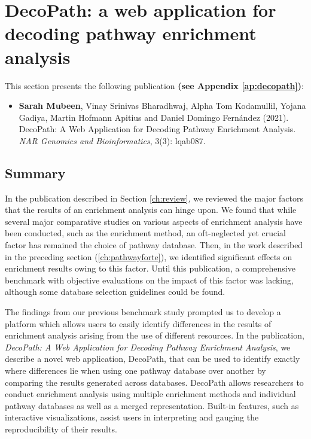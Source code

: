 \newpage

\section{DecoPath: a web application for decoding pathway enrichment analysis}

\label{ch:decopath}

This section presents the following publication \textbf{(see Appendix \ref{ap:decopath})}:

\begin{itemize}

\item[] \textbf{Sarah Mubeen}, Vinay Srinivas Bharadhwaj, Alpha Tom Kodamullil, Yojana Gadiya, Martin Hofmann Apitius and Daniel Domingo Fernández (2021). DecoPath: A Web Application for Decoding Pathway Enrichment Analysis. \textit{NAR Genomics and Bioinformatics}, 3(3): lqab087.

\end{itemize}

\subsection*{Summary}

In the publication described in Section \ref{ch:review}, we reviewed the major factors that the results of an enrichment analysis can hinge upon. We found that while several major comparative studies on various aspects of enrichment analysis have been conducted, such as the enrichment method, an oft-neglected yet crucial factor has remained the choice of pathway database. Then, in the work described in the preceding section (\ref{ch:pathwayforte}), we identified significant effects on enrichment results owing to this factor. Until this publication, a comprehensive benchmark with objective evaluations on the impact of this factor was lacking, although some database selection guidelines could be found. 

The findings from our previous benchmark study prompted us to develop a platform which allows users to easily identify differences in the results of enrichment analysis arising from the use of different resources. In the publication, \textit{DecoPath: A Web Application for Decoding Pathway Enrichment Analysis}, we describe a novel web application, DecoPath, that can be used to identify exactly where differences lie when using one pathway database over another by comparing the results generated across databases. DecoPath allows researchers to conduct enrichment analysis using multiple enrichment methods and individual pathway databases as well as a merged representation. Built-in features, such as interactive visualizations, assist users in interpreting and gauging the reproducibility of their results. 

